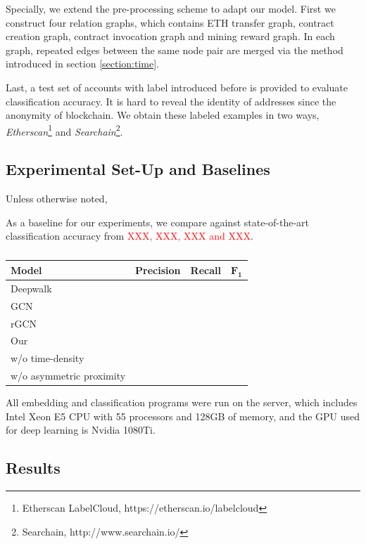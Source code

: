Specially, we extend the pre-processing scheme to adapt our model. First we construct four relation graphs, which contains ETH transfer graph, contract creation graph, contract invocation graph and mining reward graph. In each graph, repeated edges between the same node pair are merged via the method introduced in section \ref{section:time}.

Last, a test set of accounts with label introduced before is provided to evaluate classification accuracy. It is hard to reveal the identity of addresses since the anonymity of blockchain. We obtain these labeled examples in two ways, \emph{Etherscan}\footnote{Etherscan LabelCloud, https://etherscan.io/labelcloud} and \emph{Searchain}\footnote{Searchain, http://www.searchain.io/}.




\subsection{Experimental Set-Up and Baselines}
Unless otherwise noted,

As a baseline for our experiments, we compare against state-of-the-art classification accuracy from \textcolor{red}{XXX, XXX, XXX and XXX}.
\begin{table}
\centering
\caption{}
\begin{tabular}{l|ccc}
\toprule
\textbf{Model} & \textbf{Precision}  & \textbf{Recall} & $\mathbf{F_1}$  \\
\midrule
 Deepwalk & & & \\
 GCN & & & \\
 rGCN & & & \\
 Our & & & \\
\midrule
 w/o time-density& & & \\
 w/o asymmetric proximity & & & \\
\bottomrule
\end{tabular}
\end{table}

All embedding and classification programs were run on the server, which includes Intel Xeon E5 CPU with 55 processors and 128GB of memory, and the GPU used for deep learning is Nvidia 1080Ti.

\subsection{Results}



